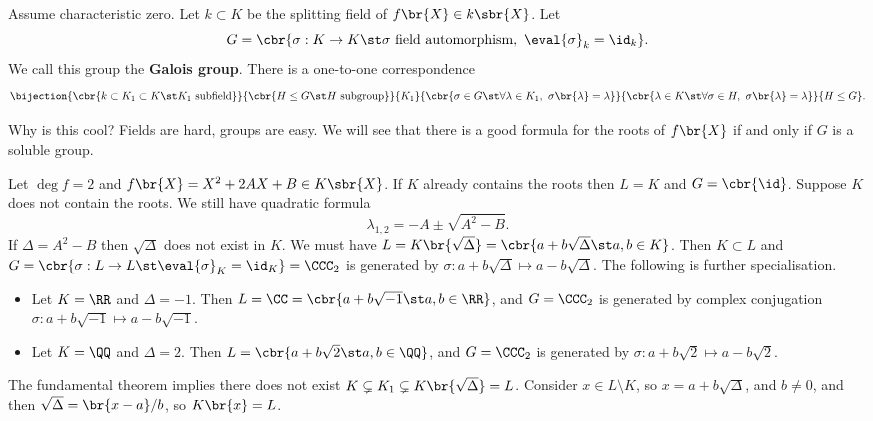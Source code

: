 \begin{theorem}
\label{thm:galoiscorrespondence}
Assume characteristic zero. Let $ k \subset K $ be the splitting field of $ f\br{X} \in k\sbr{X} $. Let
$$ G = \cbr{\sigma : K \to K \st \sigma \ \text{field automorphism}, \ \eval{\sigma}_k = \id_k}. $$
We call this group the \textbf{Galois group}. There is a one-to-one correspondence
$$ \bijection{\cbr{k \subset K_1 \subset K \st K_1 \ \text{subfield}}}{\cbr{H \le G \st H \ \text{subgroup}}}{K_1}{\cbr{\sigma \in G \st \forall \lambda \in K_1, \ \sigma\br{\lambda} = \lambda}}{\cbr{\lambda \in K \st \forall \sigma \in H, \ \sigma\br{\lambda} = \lambda}}{H \le G}. $$
\end{theorem}

Why is this cool? Fields are hard, groups are easy. We will see that there is a good formula for the roots of $ f\br{X} $ if and only if $ G $ is a soluble group.

\pagebreak


\begin{example*}
Let $ \deg f = 2 $ and $ f\br{X} = X^2 + 2AX + B \in K\sbr{X} $. If $ K $ already contains the roots then $ L = K $ and $ G = \cbr{\id} $. Suppose $ K $ does not contain the roots. We still have quadratic formula
$$ \lambda_{1, 2} = -A \pm \sqrt{A^2 - B}. $$
If $ \Delta = A^2 - B $ then $ \sqrt{\Delta} $ does not exist in $ K $. We must have $ L = K\br{\sqrt{\Delta}} = \cbr{a + b\sqrt{\Delta} \st a, b \in K} $. Then $ K \subset L $ and $ G = \cbr{\sigma : L \to L \st \eval{\sigma}_K = \id_K} = \CCC_2 $ is generated by $ \sigma : a + b\sqrt{\Delta} \mapsto a - b\sqrt{\Delta} $. The following is further specialisation.
\begin{itemize}
\item Let $ K = \RR $ and $ \Delta = -1 $. Then $ L = \CC = \cbr{a + b\sqrt{-1} \st a, b \in \RR} $, and $ G = \CCC_2 $ is generated by complex conjugation $ \sigma : a + b\sqrt{-1} \mapsto a - b\sqrt{-1} $.
\item Let $ K = \QQ $ and $ \Delta = 2 $. Then $ L = \cbr{a + b\sqrt{2} \st a, b \in \QQ} $, and $ G = \CCC_2 $ is generated by $ \sigma : a + b\sqrt{2} \mapsto a - b\sqrt{2} $.
\end{itemize}
The fundamental theorem implies there does not exist $ K \subsetneq K_1 \subsetneq K\br{\sqrt{\Delta}} = L $. Consider $ x \in L \setminus K $, so $ x = a + b\sqrt{\Delta} $, and $ b \ne 0 $, and then $ \sqrt{\Delta} = \br{x - a} / b $, so $ K\br{x} = L $.
\end{example*}

